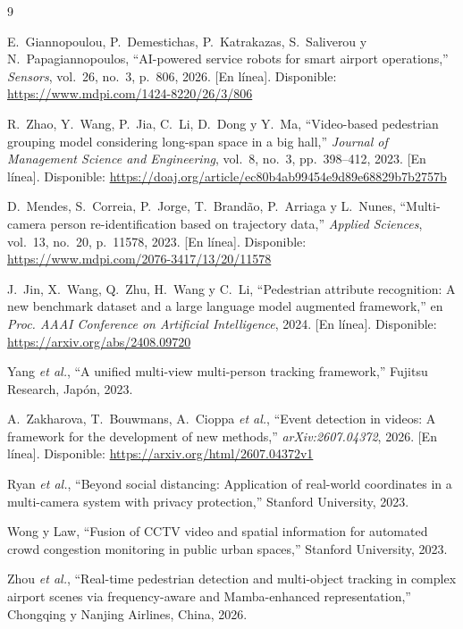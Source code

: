 \documentclass[12pt,letterpaper]{article}
\begin{document}
\begin{thebibliography}{9}

E.~Giannopoulou, P.~Demestichas, P.~Katrakazas, S.~Saliverou y
N.~Papagiannopoulos, ``AI-powered service robots for smart airport
operations,'' \textit{Sensors}, vol.~26, no.~3, p.~806, 2026. [En
línea]. Disponible: \url{https://www.mdpi.com/1424-8220/26/3/806}

R.~Zhao, Y.~Wang, P.~Jia, C.~Li, D.~Dong y Y.~Ma, ``Video-based
pedestrian grouping model considering long-span space in a big hall,''
\textit{Journal of Management Science and Engineering}, vol.~8, no.~3,
pp.~398--412, 2023. [En línea]. Disponible:
\url{https://doaj.org/article/ec80b4ab99454e9d89e68829b7b2757b}

D.~Mendes, S.~Correia, P.~Jorge, T.~Brandão, P.~Arriaga y L.~Nunes,
``Multi-camera person re-identification based on trajectory data,''
\textit{Applied Sciences}, vol.~13, no.~20, p.~11578, 2023. [En línea].
Disponible: \url{https://www.mdpi.com/2076-3417/13/20/11578}

J.~Jin, X.~Wang, Q.~Zhu, H.~Wang y C.~Li, ``Pedestrian attribute
recognition: A new benchmark dataset and a large language model augmented
framework,'' en \textit{Proc. AAAI Conference on Artificial
Intelligence}, 2024. [En línea]. Disponible:
\url{https://arxiv.org/abs/2408.09720}

Yang \textit{et al.}, ``A unified multi-view multi-person tracking
framework,'' Fujitsu Research, Japón, 2023.

A.~Zakharova, T.~Bouwmans, A.~Cioppa \textit{et al.}, ``Event detection
in videos: A framework for the development of new methods,''
\textit{arXiv:2607.04372}, 2026. [En línea]. Disponible:
\url{https://arxiv.org/html/2607.04372v1}

Ryan \textit{et al.}, ``Beyond social distancing: Application of
real-world coordinates in a multi-camera system with privacy
protection,'' Stanford University, 2023.

Wong y Law, ``Fusion of CCTV video and spatial information for automated
crowd congestion monitoring in public urban spaces,'' Stanford
University, 2023.

Zhou \textit{et al.}, ``Real-time pedestrian detection and multi-object
tracking in complex airport scenes via frequency-aware and
Mamba-enhanced representation,'' Chongqing y Nanjing Airlines, China,
2026.

\end{thebibliography}
\end{document}
